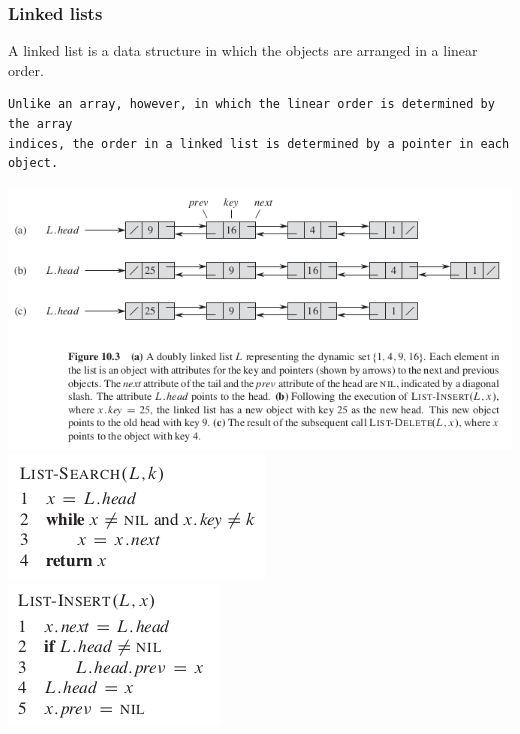 \documentclass[11pt]{article}
\begin{document}
\subsubsection{Linked lists}
\label{sec-4-1-2}
A linked list is a data structure in which the objects are arranged in a linear order. \\

\begin{verbatim}
Unlike an array, however, in which the linear order is determined by the array
indices, the order in a linked list is determined by a pointer in each object.
\end{verbatim}

\includegraphics[width=.9\linewidth]{pics/c10_linked_list.png} \\

\includegraphics[width=.9\linewidth]{pics/c10_linked_list_search.png} \\

\includegraphics[width=.9\linewidth]{pics/c10_linked_list_insert.png} \\
\end{document}

